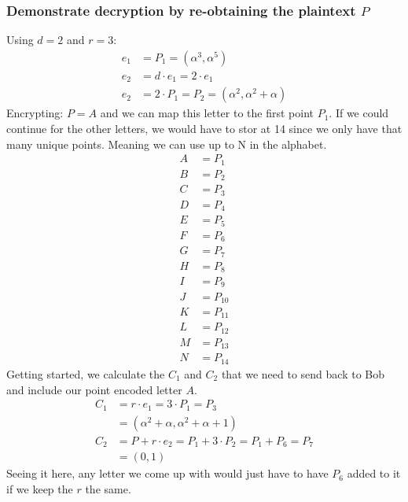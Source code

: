 \documentclass[a4paper,11pt]{exam}
\begin{document}
\subsubsection{Demonstrate decryption by re-obtaining the plaintext \(P\)}
\label{sec:org44d5309}
Using \(d = 2\) and \(r = 3\):
\begin{align*}
e_1 &= P_1 = (\alpha^3, \alpha^5)\\
e_2 &= d\cdot e_1 = 2\cdot e_1\\
e_2 &= 2\cdot P_1 = P_2 = (\alpha^2, \alpha^2+\alpha)
\end{align*}
Encrypting: \(P = A\) and we can map this letter to the first point \(P_1\). If we could continue for the other letters, we would have to stor at 14 since we only have that many unique points. Meaning we can use up to N in the alphabet.
\begin{align}
A &= P_{1}\\
B &= P_{2}\\
C &= P_{3}\\
D &= P_{4}\\
E &= P_{5}\\
F &= P_{6}\\
G &= P_{7}\\
H &= P_{8}\\
I &= P_{9}\\
J &= P_{10}\\
K &= P_{11}\\
L &= P_{12}\\
M &= P_{13}\\
N &= P_{14}
\end{align}
Getting started, we calculate the \(C_1\) and \(C_2\) that we need to send back to Bob and include our point encoded letter \(A\). 
\begin{align*}
C_1 &= r\cdot e_1 = 3\cdot P_1 = P_3\\
    &= (\alpha^2+\alpha, \alpha^2+\alpha+1)\\
C_2 &= P + r\cdot e_2 = P_1 + 3\cdot P_2 = P_1 + P_6 = P_7\\
    &= (0, 1)
\end{align*}
Seeing it here, any letter we come up with would just have to have \(P_6\) added to it if we keep the \(r\) the same.
\end{document}

